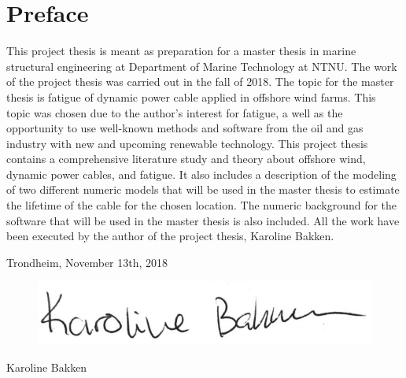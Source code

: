 \hypersetup{pageanchor=true}
%
\chapter*{Preface}
This project thesis is meant as preparation for a master thesis in marine structural engineering at Department of Marine Technology at NTNU. The work of the project thesis was carried out in the fall of 2018. \newline
\newline
The topic for the master thesis is fatigue of dynamic power cable applied in offshore wind farms. This topic was chosen due to the author's interest for fatigue, a well as the opportunity to use well-known methods and software from the oil and gas industry with new and upcoming renewable technology. This project thesis contains a comprehensive literature study and theory about offshore wind, dynamic power cables, and fatigue. It also includes a description of the modeling of two different numeric models that will be used in the master thesis to estimate the lifetime of the cable for the chosen location. The numeric background for the software that will be used in the master thesis is also included. \newline
\newline
All the work have been executed by the author of the project thesis, Karoline Bakken. 
\newline
\newline
\newline
\newline
\newline
\newline
\begin{center}
    Trondheim, November 13th, 2018
    \end{center}
\begin{figure}[H]
\centering
\includegraphics[scale=0.5]{figures/sign}
\end{figure}
\begin{center}
Karoline Bakken
\end{center}